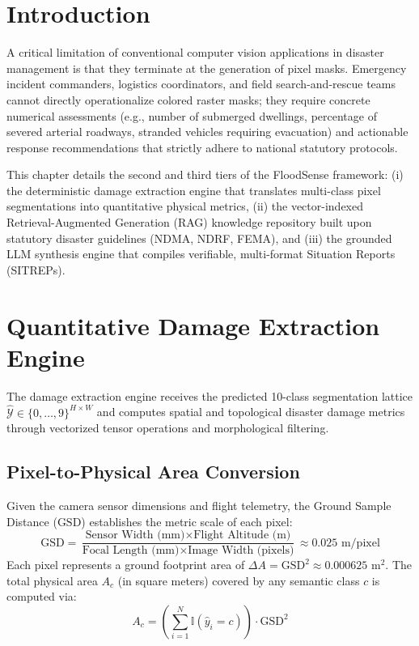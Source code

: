 \label{chap:damage_assessment_rag}

\section{Introduction}
A critical limitation of conventional computer vision applications in disaster management is that they terminate at the generation of pixel masks. Emergency incident commanders, logistics coordinators, and field search-and-rescue teams cannot directly operationalize colored raster masks; they require concrete numerical assessments (e.g., number of submerged dwellings, percentage of severed arterial roadways, stranded vehicles requiring evacuation) and actionable response recommendations that strictly adhere to national statutory protocols.

This chapter details the second and third tiers of the FloodSense framework: (i) the deterministic damage extraction engine that translates multi-class pixel segmentations into quantitative physical metrics, (ii) the vector-indexed Retrieval-Augmented Generation (RAG) knowledge repository built upon statutory disaster guidelines (NDMA, NDRF, FEMA), and (iii) the grounded LLM synthesis engine that compiles verifiable, multi-format Situation Reports (SITREPs).

\section{Quantitative Damage Extraction Engine}
The damage extraction engine receives the predicted 10-class segmentation lattice $\hat{\mathcal{Y}} \in \{0, \dots, 9\}^{H \times W}$ and computes spatial and topological disaster damage metrics through vectorized tensor operations and morphological filtering.

\subsection{Pixel-to-Physical Area Conversion}
Given the camera sensor dimensions and flight telemetry, the Ground Sample Distance ($\text{GSD}$) establishes the metric scale of each pixel:
\begin{equation}
    \text{GSD} = \frac{\text{Sensor Width (mm)} \times \text{Flight Altitude (m)}}{\text{Focal Length (mm)} \times \text{Image Width (pixels)}} \approx 0.025 \text{ m/pixel}
\end{equation}
Each pixel represents a ground footprint area of $\Delta A = \text{GSD}^2 \approx 0.000625\text{ m}^2$. The total physical area $A_c$ (in square meters) covered by any semantic class $c$ is computed via:
\begin{equation}
    A_c = \left( \sum_{i=1}^N \mathbb{I}(\hat{y}_i = c) \right) \cdot \text{GSD}^2
\end{equation}

